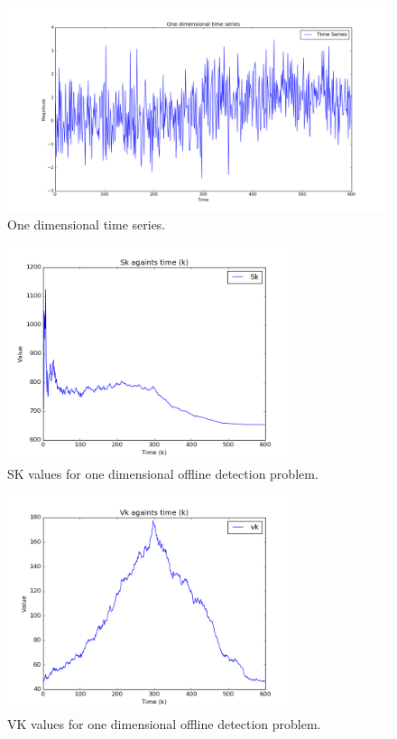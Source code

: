 \documentclass{article}
\begin{document}
\begin{figure}[ht!]
  \centering
  \includegraphics[width=1\textwidth]{images/1d_offline/ts}
  \caption{One dimensional time series.\label{fig:1d_ts}}
\end{figure}

\begin{figure}[ht!]
  \centering
  \includegraphics[width=0.75\textwidth]{images/1d_offline/sk}
  \caption{SK values for one dimensional offline detection problem.\label{fig:1d_sk}}
\end{figure}

\begin{figure}[ht!]
  \centering
  \includegraphics[width=0.75\textwidth]{images/1d_offline/vk}
  \caption{VK values for one dimensional offline detection problem.\label{fig:1d_vk}}
\end{figure}
\end{document}
